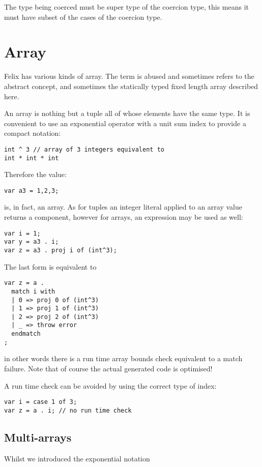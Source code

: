 \documentclass[oneside]{book}
\begin{document}
The type being coerced must be super type of the coercion type,
this means it must have subset of the cases of the coercion type.


\section{Array}
Felix has various kinds of array. The term is abused and sometimes
refers to the abstract concept, and sometimes the statically
typed fixed length array described here.

An array is nothing but a tuple all of whose elements have the
same type. It is convenient to use an exponential operator with
a  unit sum index to provide a compact notation:

\begin{verbatim}
int ^ 3 // array of 3 integers equivalent to
int * int * int
\end{verbatim}

Therefore the value:

\begin{verbatim}
var a3 = 1,2,3;
\end{verbatim}

is, in fact, an array. As for tuples an integer literal applied
to an array value returns a component, however for arrays,
an expression may be used as well:

\begin{verbatim}
var i = 1;
var y = a3 . i;
var z = a3 . proj i of (int^3);
\end{verbatim}

The last form is equivalent to

\begin{verbatim}
var z = a . 
  match i with
  | 0 => proj 0 of (int^3)
  | 1 => proj 1 of (int^3)
  | 2 => proj 2 of (int^3)
  | _ => throw error
  endmatch
;
\end{verbatim}

in other words there is a run time array bounds check equivalent to a match failure.
Note that of course the actual generated code is optimised!

A run time check can be avoided by using the correct type of index:

\begin{verbatim}
var i = case 1 of 3;
var z = a . i; // no run time check
\end{verbatim}


\subsection{Multi-arrays}
Whilst we introduced the exponential notation
\end{document}
